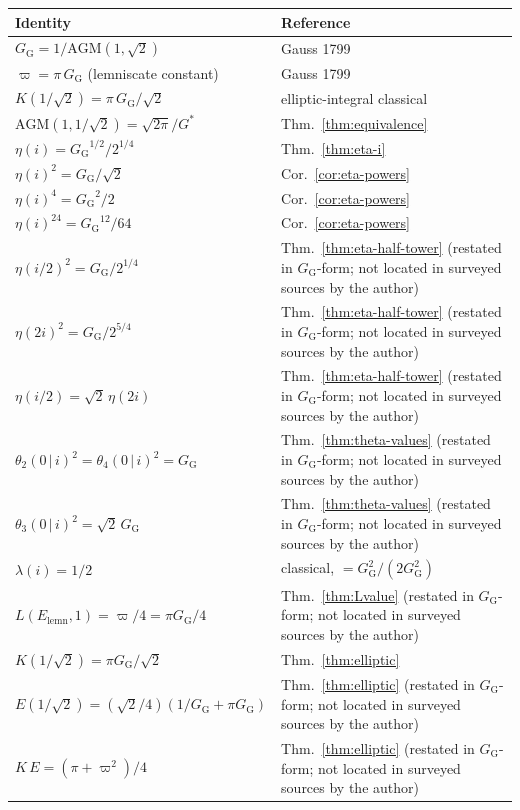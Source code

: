 \documentclass[11pt]{article}
\theoremstyle{definition}
\theoremstyle{remark}
\newcommand{\Gs}{G^{*}}
\newcommand{\GG}{G_{\!\scriptscriptstyle\mathrm{G}}}
\newcommand{\AGM}{\mathrm{AGM}}
\begin{document}
\begin{center}
\begin{tabular}{p{}p{}}
\toprule
Identity & Reference \\
\midrule
$\GG = 1/\AGM(1, \sqrt 2)$ & Gauss 1799 \\
$\varpi = \pi\,\GG$ (lemniscate constant) & Gauss 1799 \\
$K(1/\sqrt 2) = \pi\,\GG/\sqrt 2$ & elliptic-integral classical \\
$\AGM(1, 1/\sqrt 2) = \sqrt{2\pi}/\Gs$ & Thm.~\ref{thm:equivalence} \\
$\eta(i) = {\GG}^{1/2}/2^{1/4}$ & Thm.~\ref{thm:eta-i} \\
$\eta(i)^2 = \GG/\sqrt 2$ & Cor.~\ref{cor:eta-powers} \\
$\eta(i)^4 = {\GG}^2/2$ & Cor.~\ref{cor:eta-powers} \\
$\eta(i)^{24} = {\GG}^{12}/64$ & Cor.~\ref{cor:eta-powers} \\
$\eta(i/2)^2 = \GG/2^{1/4}$ & Thm.~\ref{thm:eta-half-tower} (restated in $\GG$-form; not located in surveyed sources by the author) \\
$\eta(2i)^2 = \GG/2^{5/4}$ & Thm.~\ref{thm:eta-half-tower} (restated in $\GG$-form; not located in surveyed sources by the author) \\
$\eta(i/2) = \sqrt 2\,\eta(2i)$ & Thm.~\ref{thm:eta-half-tower} (restated in $\GG$-form; not located in surveyed sources by the author) \\
$\theta_2(0\,|\,i)^2 = \theta_4(0\,|\,i)^2 = \GG$ & Thm.~\ref{thm:theta-values} (restated in $\GG$-form; not located in surveyed sources by the author) \\
$\theta_3(0\,|\,i)^2 = \sqrt 2\,\GG$ & Thm.~\ref{thm:theta-values} (restated in $\GG$-form; not located in surveyed sources by the author) \\
$\lambda(i) = 1/2$ & classical, $= \GG^2/(2\GG^2)$ \\
$L(E_{\mathrm{lemn}}, 1) = \varpi/4 = \pi\GG/4$ & Thm.~\ref{thm:Lvalue} (restated in $\GG$-form; not located in surveyed sources by the author) \\
$K(1/\sqrt 2) = \pi\GG/\sqrt 2$ & Thm.~\ref{thm:elliptic} \\
$E(1/\sqrt 2) = (\sqrt 2/4)(1/\GG + \pi\GG)$ & Thm.~\ref{thm:elliptic} (restated in $\GG$-form; not located in surveyed sources by the author) \\
$K\,E = (\pi + \varpi^2)/4$ & Thm.~\ref{thm:elliptic} (restated in $\GG$-form; not located in surveyed sources by the author) \\

\end{tabular}
\end{center}
\end{document}
